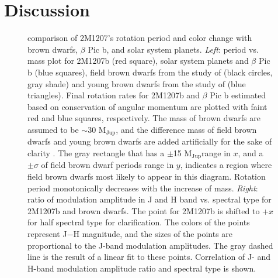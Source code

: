 \documentclass[apj]{emulateapj}
\newcommand{\bpic}{$\beta$ Pic}
\newcommand{\mjup}{M$_{\mbox{Jup}}$}
\begin{document}
\section{Discussion}
\label{sec:discussion}
\begin{figure}
  \centering
  \caption{comparison of 2M1207's rotation period and color change
    with brown dwarfs, \bpic{} b, and solar system planets. {\em
      Left}: period vs. mass plot for 2M1207b (red square), solar
    system planets and \bpic{} b (blue squares), field brown dwarfs
    from the study of \citet[][]{Metchev2015}
    (black circles, gray shade) and young brown dwarfs from the study
    of \citet{Scholz2015} (blue
    triangles). Final rotation rates for 2M1207b and \bpic{} b
    estimated based on conservation of angular momentum are plotted
    with faint red and blue squares, respectively. The mass of brown
    dwarfs are assumed to be $\sim30$ \mjup{}, and the difference mass
    of field brown dwarfs and young brown dwarfs are added
    artificially for the sake of clarity . The gray rectangle that has a
    $\pm$15
    \mjup range in $x$,
    and a $\pm \sigma$
    of field brown dwarf periods range in $y$,
    indicates a region where field brown dwarfs most likely to appear in
    this diagram. Rotation period monotonically decreases with the
    increase of mass. {\em Right}: ratio of modulation amplitude in J
    and H band vs. spectral type for 2M1207b and brown dwarfs. The
    point for 2M1207b is shifted to +$x$
    for half spectral type for clarification.  The colors of the
    points represent J$-$H
    magnitude, and the sizes of the points are proportional to the
    J-band modulation amplitudes. The gray dashed line is the result
    of a linear fit to these points.  Correlation of J- and H-band
    modulation amplitude ratio and spectral type is shown.}
 \label{fig:5}
\end{figure}
\end{document}
